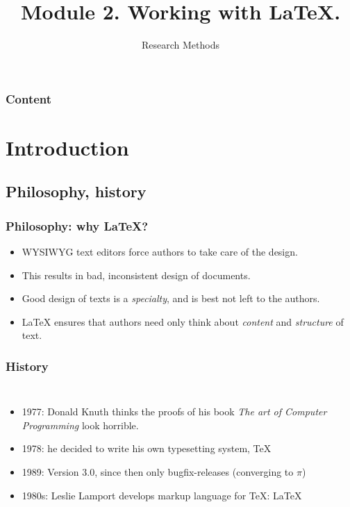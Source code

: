 \documentclass[aspectratio=169]{beamer}
\title{Module 2. Working with \LaTeX.}
\subtitle{Research Methods}
\author{\lecturers}   %
\date{\academicyear}
\begin{document}
\begin{frame}
  \maketitle
\end{frame}

\begin{frame}
  \frametitle{Content}

  \tableofcontents
\end{frame}

\section{Introduction}

\subsection{Philosophy, history}

\begin{frame}
  \frametitle{Philosophy: why {\LaTeX}?}

  \begin{itemize}
    \item<+-> WYSIWYG text editors force authors to take care of the design.
    \item<+-> This results in bad, inconsistent design of documents.
    \item<+-> Good design of texts is a \textit{specialty}, and is best not left to the authors.
    \item<+-> {\LaTeX} ensures that authors need only think about \textit{content} and \textit{structure} of text.
  \end{itemize}
\end{frame}

\begin{frame}[plain]
  \frametitle{History}

  \begin{columns}[c]

    \begin{itemize}
      \item<+-> 1977: Donald Knuth thinks the proofs of his book \textit{The art of Computer Programming} look horrible.
      \item<+-> 1978: he decided to write his own typesetting system, {\TeX}
      \item<+-> 1989: Version 3.0, since then only bugfix-releases (converging to \(\pi\))
      \item<+-> 1980s: Leslie Lamport develops markup language for {\TeX}: {\LaTeX}
    \end{itemize}

    \begin{center}
    \end{center}

  \end{columns}
\end{frame}
\end{document}
